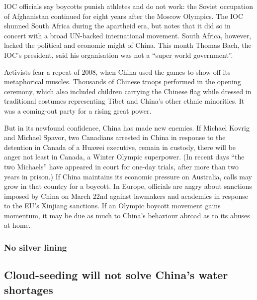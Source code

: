 \documentclass{article}
\begin{document}
IOC officials say boycotts punish athletes and do not work: the Soviet occupation of Afghanistan continued for eight years after the Moscow Olympics. The IOC shunned South Africa during the apartheid era, but notes that it did so in concert with a broad UN-backed international movement. South Africa, however, lacked the political and economic might of China. This month Thomas Bach, the IOC's president, said his organisation was not a ``super world government''. 

Activists fear a repeat of 2008, when China used the games to show off its metaphorical muscles. Thousands of Chinese troops performed in the opening ceremony, which also included children carrying the Chinese flag while dressed in traditional costumes representing Tibet and China's other ethnic minorities. It was a coming-out party for a rising great power. 

But in its newfound confidence, China has made new enemies. If Michael Kovrig and Michael Spavor, two Canadians arrested in China in response to the detention in Canada of a Huawei executive, remain in custody, there will be anger not least in Canada, a Winter Olympic superpower. (In recent days ``the two Michaels'' have appeared in court for one-day trials, after more than two years in prison.) If China maintains its economic pressure on Australia, calls may grow in that country for a boycott. In Europe, officials are angry about sanctions imposed by China on March 22nd against lawmakers and academics in response to the EU's Xinjiang sanctions. If an Olympic boycott movement gains momentum, it may be due as much to China's behaviour abroad as to its abuses at home. {} 
\clearpage
\subsubsection{No silver lining }
\subsection{Cloud-seeding will not solve China's water shortages }
\end{document}
